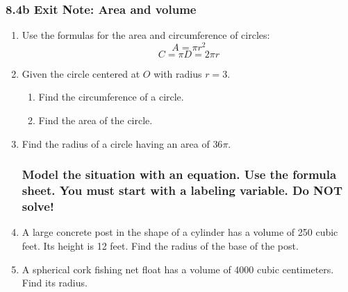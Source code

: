 \documentclass[12pt, twoside]{article}
\begin{document}
\subsubsection*{8.4b Exit Note: Area and volume}
 \begin{enumerate}

  \item Use the formulas for the area and circumference of circles:
\[A=\pi r^2\]
\[C=\pi D = 2\pi r\]

  \item Given the circle centered at $O$ with radius $r=3$.
  \begin{multicols}{2}
    \begin{enumerate}
      \item Find the circumference of a circle. %
      \item Find the area of the circle.\vspace{2cm}
    \end{enumerate}
  \end{multicols}

  \item Find the radius of a circle having an area of $36 \pi$. \vspace{2cm}

\subsubsection*{Model the situation with an equation. Use the formula sheet. You must start with a labeling variable. \hfill Do NOT solve!}

  \item A large concrete post in the shape of a cylinder has a volume of 250 cubic feet. Its height is 12 feet. Find the radius of the base of the post. \vspace{2cm}

  \item A spherical cork fishing net float has a volume of 4000 cubic centimeters. Find its radius. \vspace{2cm}


\end{enumerate}
\end{document}
